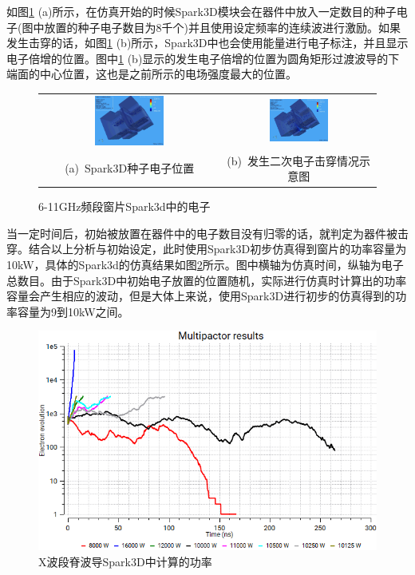 \documentclass[master]{thesis-uestc}
\begin{document}
如图\ref{fig:XSP3D电子放置} (a)所示，在仿真开始的时候Spark3D模块会在器件中放入一定数目的种子电子(图中放置的种子电子数目为8千个)并且使用设定频率的连续波进行激励。如果发生击穿的话，如图\ref{fig:XSP3D电子放置} (b)所示，Spark3D中也会使用能量进行电子标注，并且显示电子倍增的位置。图中\ref{fig:XSP3D电子放置} (b)显示的发生电子倍增的位置为圆角矩形过渡波导的下端面的中心位置，这也是之前所示的电场强度最大的位置。
\begin{figure}[!htb]
    \small
    \centering
    \begin{tabular}{@{\ }c@{\ }c}
        \includegraphics[width=0.4\textwidth]{pic/chapter3/XSP3D开始电子.png} & 
        \hspace{5pt}
        \includegraphics[width=0.4\textwidth]{pic/chapter3/XSP3D发生击穿.png}     \\
        \mbox{\small (a) Spark3D种子电子位置}                                                                               & 
        \mbox{\small (b) 发生二次电子击穿情况示意图}                                                                                  \\
    \end{tabular}
    \caption{6-11GHz频段窗片Spark3d中的电子}
    \label{fig:XSP3D电子放置}
\end{figure}

当一定时间后，初始被放置在器件中的电子数目没有归零的话，就判定为器件被击穿。结合以上分析与初始设定，此时使用Spark3D初步仿真得到窗片的功率容量为10kW，具体的Spark3d的仿真结果如图\ref{fig:X波段Spark3D中的功率}所示。图中横轴为仿真时间，纵轴为电子总数目。由于Spark3D中初始电子放置的位置随机，实际进行仿真时计算出的功率容量会产生相应的波动，但是大体上来说，使用Spark3D进行初步的仿真得到的功率容量为9到10kW之间。
\begin{figure}[!htb]
    \centering
    \includegraphics[width=0.5\linewidth]{pic/chapter3/X波段Spark3D中的功率.png}
    \caption{X波段脊波导Spark3D中计算的功率}
    \label{fig:X波段Spark3D中的功率}
\end{figure}
\end{document}
